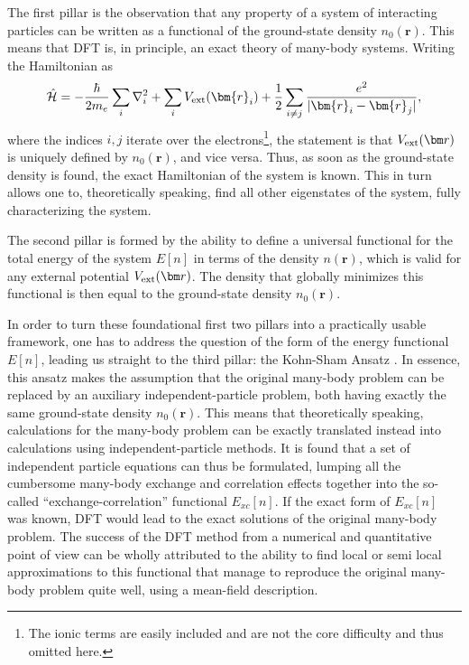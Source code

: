 The first pillar is the observation that any property of a system of interacting particles can be written as a functional of the ground-state density $n_0(\bm{r})$.
This means that DFT is, in principle, an exact theory of many-body systems.
Writing the Hamiltonian as
\begin{equation}
	\hat{\mathcal{H}} = -\frac{\hbar}{2m_e} \sum_i \nabla_i^2 + \sum_i V_{\rm ext}(\bm{r}_i) + \frac{1}{2}\sum_{i\neq j} \frac{e^2}{|\bm{r}_i - \bm{r}_j|},
\end{equation}
where the indices $i,j$ iterate over the electrons\footnote{The ionic terms are easily included and are not the core difficulty and thus omitted here.}, the statement is that $V_{\rm ext}(\bm r)$ is uniquely defined by $n_0(\bm{r})$, and vice versa.
Thus, as soon as the ground-state density is found, the exact Hamiltonian of the system is known.
This in turn allows one to, theoretically speaking, find all other eigenstates of the system, fully characterizing the system.

The second pillar is formed by the ability to define a universal functional for the total energy of the system $E[n]$ in terms of the density $n(\bm{r})$, which is valid for any external potential $V_{\rm ext}(\bm r)$.
The density that globally minimizes this functional is then equal to the ground-state density $n_0(\bm{r})$.

In order to turn these foundational first two pillars into a practically usable framework, one has to address the question of the form of the energy functional $E[n]$, leading us straight to the third pillar: the Kohn-Sham Ansatz \cite{Kohn1965}.
In essence, this ansatz makes the assumption that the original many-body problem can be replaced by an auxiliary independent-particle problem, both having exactly the same ground-state density $n_0(\bm{r})$.
This means that theoretically speaking, calculations for the many-body problem can be exactly translated instead into calculations using independent-particle methods.
It is found that a set of independent particle equations can thus be formulated, lumping all the cumbersome many-body exchange and correlation effects together into the so-called ``exchange-correlation'' functional $E_{xc}[n]$.
If the exact form of $E_{xc}[n]$ was known, DFT would lead to the exact solutions of the original many-body problem.
The success of the DFT method from a numerical and quantitative point of view can be wholly attributed to the ability to find local or semi local approximations to this functional that manage to reproduce the original many-body problem quite well, using a mean-field description.

